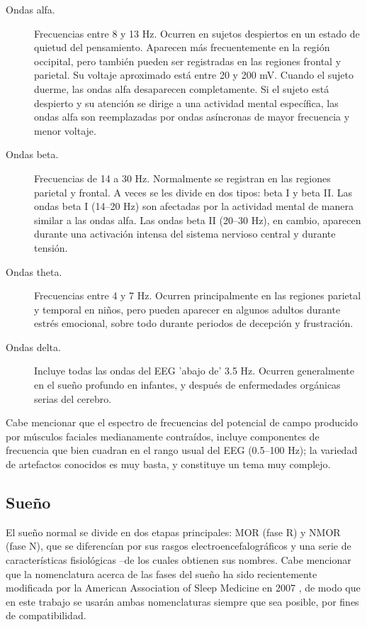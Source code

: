 \documentclass[12pt,a4paper]{mitthesis}
\begin{document}
\begin{description}
\item[Ondas alfa.] Frecuencias entre 8 y 13 Hz. Ocurren en sujetos despiertos en un estado de 
quietud del pensamiento. Aparecen m\'as frecuentemente en la regi\'on occipital, pero tambi\'en 
pueden ser registradas en las regiones frontal y parietal. Su voltaje aproximado est\'a entre 20 y 
200 mV. Cuando el sujeto duerme, las ondas alfa desaparecen completamente. Si el sujeto est\'a
despierto y su atenci\'on se dirige a una actividad mental espec\'ifica, las ondas alfa son 
reemplazadas por ondas as\'incronas de mayor frecuencia y menor voltaje.

\item[Ondas beta.] Frecuencias de 14 a 30 Hz. Normalmente se registran en las regiones parietal y 
frontal. A veces se les divide en dos tipos: beta I y beta II. Las ondas beta I (14--20 Hz) son 
afectadas por la actividad mental de manera similar a las ondas alfa.
Las ondas beta II (20--30 Hz), en cambio, aparecen durante una activaci\'on intensa del sistema 
nervioso central y durante tensi\'on.

\item[Ondas theta.] Frecuencias entre 4 y 7 Hz. Ocurren principalmente en las regiones parietal y 
temporal en ni\~nos, pero pueden aparecer en algunos adultos durante estr\'es emocional, sobre 
todo durante periodos de decepci\'on y frustraci\'on.

\item[Ondas delta.] Incluye todas las ondas del EEG 'abajo de' 3.5 Hz. Ocurren generalmente en el 
sue\~no profundo en infantes, y despu\'es de enfermedades org\'anicas serias del cerebro.
\end{description}

Cabe mencionar que el espectro de frecuencias del potencial de campo producido por m\'usculos 
faciales medianamente contra\'idos, incluye componentes de frecuencia que bien cuadran en el rango 
usual del EEG (0.5--100 Hz); la variedad de artefactos conocidos es muy basta, y constituye un tema 
muy complejo.

\subsection{Sue\~no}

El sue\~no normal se divide en dos etapas principales: MOR (fase R) y NMOR (fase N), que se 
diferenc\'ian por sus rasgos electroencefalogr\'aficos y una serie de caracter\'isticas 
fisiol\'ogicas --de los cuales obtienen sus nombres.
Cabe mencionar que la nomenclatura acerca de las fases del sue\~no ha sido recientemente modificada 
por la American Association of Sleep Medicine en 2007 \cite{AASM07}, de modo que en este trabajo se 
usar\'an ambas nomenclaturas siempre que sea posible, por fines de compatibilidad.
\end{document}

